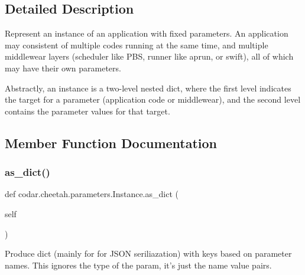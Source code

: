 \subsection{Detailed Description}
\begin{DoxyVerb}Represent an instance of an application with fixed parameters. An
application may consistent of multiple codes running at the same time,
and multiple middlewear layers (scheduler like PBS, runner like aprun,
or swift), all of which may have their own parameters.

Abstractly, an instance is a two-level nested dict, where the first
level indicates the target for a parameter (application code or
middlewear), and the second level contains the parameter values for that
target.
\end{DoxyVerb}
 

\subsection{Member Function Documentation}
\mbox{\label{classcodar_1_1cheetah_1_1parameters_1_1_instance_ae978374d4b5e01c2764b9513ae38a961}} 
\subsubsection{\texorpdfstring{as\+\_\+dict()}{as\_dict()}}
{\footnotesize\ttfamily def codar.\+cheetah.\+parameters.\+Instance.\+as\+\_\+dict (\begin{DoxyParamCaption}\item[{}]{self }\end{DoxyParamCaption})}

\begin{DoxyVerb}Produce dict (mainly for for JSON seriliazation) with keys based on
parameter names. This ignores the type of the param, it's just the
name value pairs.
\end{DoxyVerb}
 \mbox{\label{classcodar_1_1cheetah_1_1parameters_1_1_instance_a053717fc3ee7840a7c32173f15e99ae3}} 
